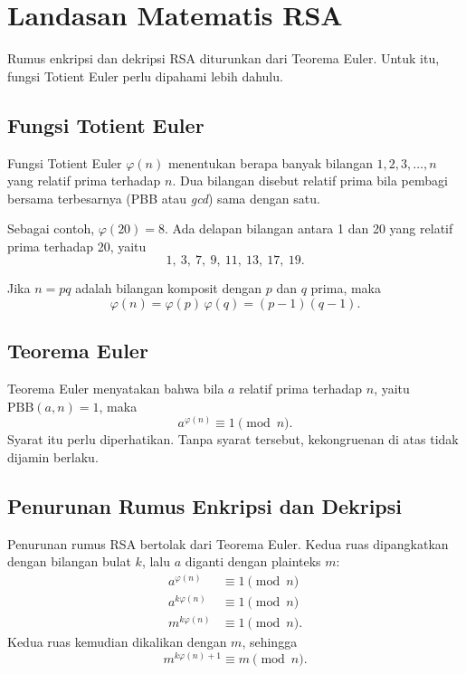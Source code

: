 \section{Landasan Matematis RSA}
\label{sec:landasan-rsa}

Rumus enkripsi dan dekripsi RSA diturunkan dari Teorema Euler. Untuk itu,
fungsi Totient Euler perlu dipahami lebih dahulu.

\subsection{Fungsi Totient Euler}

Fungsi Totient Euler $\varphi(n)$ menentukan berapa banyak bilangan
$1, 2, 3, \dots, n$ yang relatif prima terhadap $n$. Dua bilangan disebut
relatif prima bila pembagi bersama terbesarnya (PBB atau \textit{gcd}) sama
dengan satu.

Sebagai contoh, $\varphi(20) = 8$. Ada delapan bilangan antara 1 dan 20 yang
relatif prima terhadap 20, yaitu
\[
1,\ 3,\ 7,\ 9,\ 11,\ 13,\ 17,\ 19 .
\]

Jika $n = pq$ adalah bilangan komposit dengan $p$ dan $q$ prima, maka
\begin{equation}
\varphi(n) = \varphi(p)\,\varphi(q) = (p-1)(q-1).
\label{eq:totient-rsa}
\end{equation}

\subsection{Teorema Euler}

Teorema Euler menyatakan bahwa bila $a$ relatif prima terhadap $n$, yaitu
$\text{PBB}(a, n) = 1$, maka
\[
a^{\varphi(n)} \equiv 1 \pmod{n}.
\]
Syarat itu perlu diperhatikan. Tanpa syarat tersebut, kekongruenan di atas
tidak dijamin berlaku.

\subsection{Penurunan Rumus Enkripsi dan Dekripsi}

Penurunan rumus RSA bertolak dari Teorema Euler. Kedua ruas dipangkatkan
dengan bilangan bulat $k$, lalu $a$ diganti dengan plainteks $m$:
\begin{align*}
a^{\varphi(n)} &\equiv 1 \pmod{n} \\
a^{k\varphi(n)} &\equiv 1 \pmod{n} \\
m^{k\varphi(n)} &\equiv 1 \pmod{n}.
\end{align*}
Kedua ruas kemudian dikalikan dengan $m$, sehingga
\begin{equation}
m^{k\varphi(n)+1} \equiv m \pmod{n}.
\label{eq:rsa-pangkat}
\end{equation}

